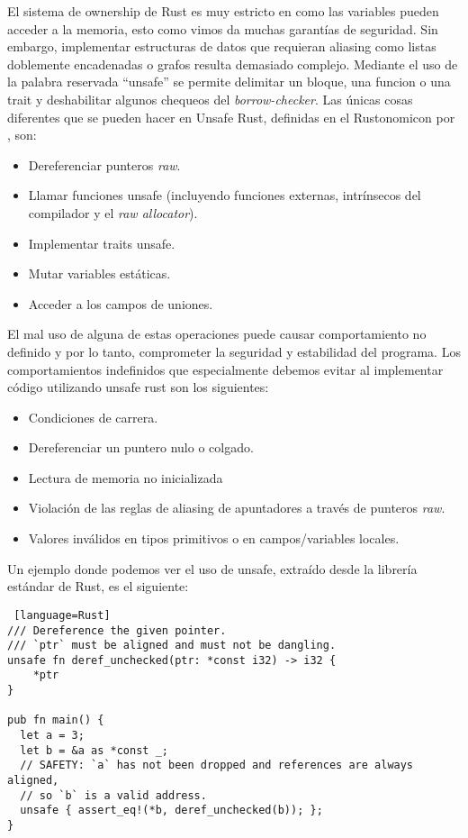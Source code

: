 El sistema de ownership de Rust es muy estricto en como las variables pueden acceder a la memoria, esto como vimos da muchas garantías de seguridad. Sin embargo, implementar estructuras de datos que requieran aliasing como listas doblemente encadenadas o grafos resulta demasiado complejo. Mediante el uso de la palabra reservada ``unsafe'' se permite delimitar un bloque, una funcion o una trait y deshabilitar algunos chequeos del \textit{borrow-checker}. Las únicas cosas diferentes que se pueden hacer en Unsafe Rust, definidas en el Rustonomicon por \cite{rustonomicon}, son:
\begin{itemize}[noitemsep]
  \item Dereferenciar punteros \textit{raw}.
  \item Llamar funciones unsafe (incluyendo funciones externas, intrínsecos del compilador y el \textit{raw allocator}).
  \item Implementar traits unsafe.
  \item Mutar variables estáticas.
  \item Acceder a los campos de uniones.
\end{itemize}
El mal uso de alguna de estas operaciones puede causar comportamiento no definido y por lo tanto, comprometer la seguridad y estabilidad del programa. Los comportamientos indefinidos que especialmente debemos evitar al implementar código utilizando unsafe rust son los siguientes:
\begin{itemize}[noitemsep]
  \item Condiciones de carrera.
  \item Dereferenciar un puntero nulo o colgado.
  \item Lectura de memoria no inicializada
  \item Violación de las reglas de aliasing de apuntadores a través de punteros \textit{raw}.
  \item Valores inválidos en tipos primitivos o en campos/variables locales.
\end{itemize}

Un ejemplo donde podemos ver el uso de unsafe, extraído desde la librería estándar de Rust, es el siguiente:
\begin{lstlisting} [language=Rust]
/// Dereference the given pointer.
/// `ptr` must be aligned and must not be dangling.
unsafe fn deref_unchecked(ptr: *const i32) -> i32 {
    *ptr
}

pub fn main() {
  let a = 3;
  let b = &a as *const _;
  // SAFETY: `a` has not been dropped and references are always aligned,
  // so `b` is a valid address.
  unsafe { assert_eq!(*b, deref_unchecked(b)); };
}
\end{lstlisting}

